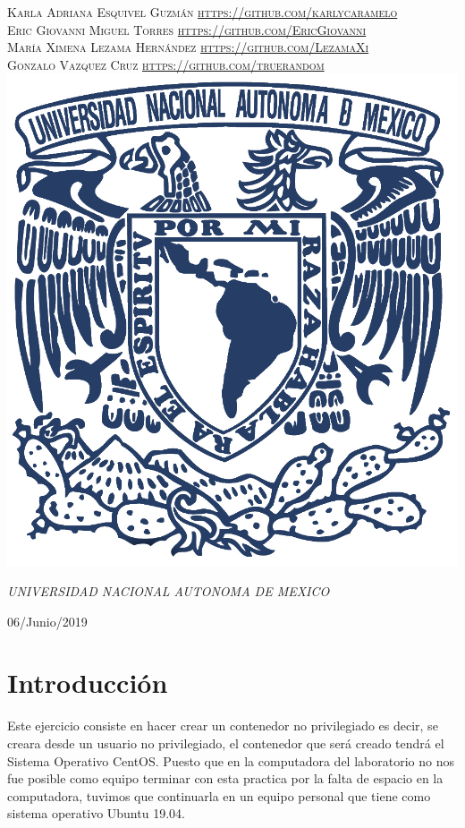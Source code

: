 \documentclass[a4paper, 11pt, oneside]{article}
\begin{document}
\begin{titlepage}
	{\scshape\Large Karla Adriana Esquivel Guzmán \url{https://github.com/karlycaramelo} \\
    Eric Giovanni Miguel Torres \url{https://github.com/EricGiovanni}\\ 
    María Ximena Lezama Hernández \url{https://github.com/LezamaXi}\\ 
    Gonzalo Vazquez Cruz \url{https://github.com/truerandom}}
	\vspace{0.5\baselineskip} 
	\vfill
	\includegraphics[scale=0.65]{unam.jpg}
	
	\textit{UNIVERSIDAD NACIONAL AUTONOMA DE MEXICO} 
	
	
	
	
	
	\vspace{0.3\baselineskip} 
	
	06/Junio/2019
	
	 

\end{titlepage}
\section*{Introducción}
Este ejercicio consiste en hacer crear un contenedor no privilegiado es decir, se creara desde un usuario no privilegiado, el contenedor que será creado tendrá el Sistema Operativo CentOS. Puesto que en la computadora del laboratorio no nos fue posible como equipo terminar con esta practica por la falta de espacio en la computadora, tuvimos que continuarla en un equipo personal que tiene como sistema operativo Ubuntu 19.04.
\end{document}
